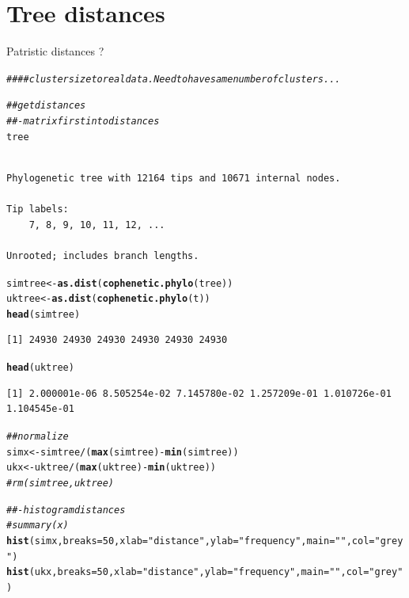 \documentclass[]{revtex4}\usepackage[]{graphicx}\usepackage[]{color}
\makeatletter
\newcommand{\hlnum}[1]{\textcolor[rgb]{0.686,0.059,0.569}{#1}}%
\newcommand{\hlstr}[1]{\textcolor[rgb]{0.192,0.494,0.8}{#1}}%
\newcommand{\hlcom}[1]{\textcolor[rgb]{0.678,0.584,0.686}{\textit{#1}}}%
\newcommand{\hlopt}[1]{\textcolor[rgb]{0,0,0}{#1}}%
\newcommand{\hlstd}[1]{\textcolor[rgb]{0.345,0.345,0.345}{#1}}%
\newcommand{\hlkwb}[1]{\textcolor[rgb]{0.69,0.353,0.396}{#1}}%
\newcommand{\hlkwc}[1]{\textcolor[rgb]{0.333,0.667,0.333}{#1}}%
\newcommand{\hlkwd}[1]{\textcolor[rgb]{0.737,0.353,0.396}{\textbf{#1}}}%
\newenvironment{kframe}{%
 \def\at@end@of@kframe{}%
 \ifinner\ifhmode%
  \def\at@end@of@kframe{\end{minipage}}%
  \begin{minipage}{\columnwidth}%
 \fi\fi%
 \def\FrameCommand##1{\hskip\@totalleftmargin \hskip-\fboxsep
 \colorbox{shadecolor}{##1}\hskip-\fboxsep
     \hskip-\linewidth \hskip-\@totalleftmargin \hskip\columnwidth}%
 \MakeFramed {\advance\hsize-\width
   \@totalleftmargin\z@ \linewidth\hsize
   \@setminipage}}%
 {\par\unskip\endMakeFramed%
 \at@end@of@kframe}
\newenvironment{knitrout}{}{} %
\makeatother
\begin{document}
\section{Tree distances}
Patristic distances ?
\begin{knitrout}
\color{fgcolor}\begin{kframe}
\begin{alltt}
\hlcom{####  cluster size to real data. Need to have same number of clusters...}

\hlcom{## get distances}
\hlcom{##- matrix first into distances}
\hlstd{tree}
\end{alltt}
\begin{verbatim}

Phylogenetic tree with 12164 tips and 10671 internal nodes.

Tip labels:
	7, 8, 9, 10, 11, 12, ...

Unrooted; includes branch lengths.
\end{verbatim}
\begin{alltt}
\hlstd{simtree} \hlkwb{<-} \hlkwd{as.dist}\hlstd{(}\hlkwd{cophenetic.phylo}\hlstd{(tree))}
\hlstd{uktree} \hlkwb{<-} \hlkwd{as.dist}\hlstd{(}\hlkwd{cophenetic.phylo}\hlstd{(t))}
\hlkwd{head}\hlstd{(simtree)}
\end{alltt}
\begin{verbatim}
[1] 24930 24930 24930 24930 24930 24930
\end{verbatim}
\begin{alltt}
\hlkwd{head}\hlstd{(uktree)}
\end{alltt}
\begin{verbatim}
[1] 2.000001e-06 8.505254e-02 7.145780e-02 1.257209e-01 1.010726e-01 1.104545e-01
\end{verbatim}
\begin{alltt}
\hlcom{## normalize}
\hlstd{simx} \hlkwb{<-} \hlstd{simtree} \hlopt{/} \hlstd{(}\hlkwd{max}\hlstd{(simtree)} \hlopt{-} \hlkwd{min}\hlstd{(simtree))}
\hlstd{ukx} \hlkwb{<-} \hlstd{uktree} \hlopt{/} \hlstd{(}\hlkwd{max}\hlstd{(uktree)} \hlopt{-} \hlkwd{min}\hlstd{(uktree))}
\hlcom{# rm(simtree, uktree)}

\hlcom{##- histogram distances}
\hlcom{# summary(x)}
\hlkwd{hist}\hlstd{(simx,} \hlkwc{breaks} \hlstd{=} \hlnum{50}\hlstd{,} \hlkwc{xlab} \hlstd{=} \hlstr{"distance"}\hlstd{,} \hlkwc{ylab} \hlstd{=} \hlstr{"frequency"}\hlstd{,} \hlkwc{main} \hlstd{=} \hlstr{""}\hlstd{,} \hlkwc{col} \hlstd{=} \hlstr{"grey"}\hlstd{)}
\hlkwd{hist}\hlstd{(ukx,} \hlkwc{breaks} \hlstd{=} \hlnum{50}\hlstd{,} \hlkwc{xlab} \hlstd{=} \hlstr{"distance"}\hlstd{,} \hlkwc{ylab} \hlstd{=} \hlstr{"frequency"}\hlstd{,} \hlkwc{main} \hlstd{=} \hlstr{""}\hlstd{,} \hlkwc{col} \hlstd{=} \hlstr{"grey"}\hlstd{)}
\end{alltt}
\end{kframe}


\end{knitrout}
\end{document}
